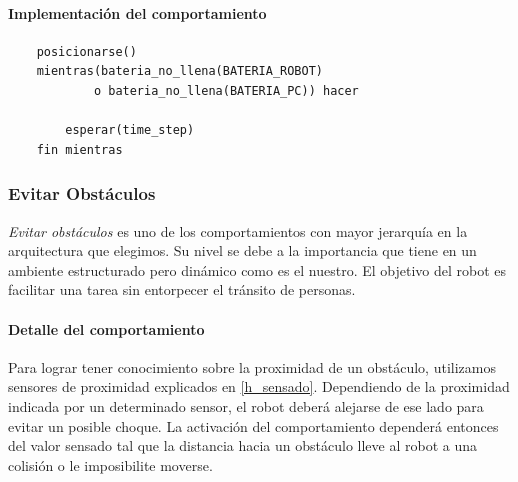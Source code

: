 \paragraph{Implementaci\'on del comportamiento}
\begin{verbatim}
    posicionarse()
    mientras(bateria_no_llena(BATERIA_ROBOT)
            o bateria_no_llena(BATERIA_PC)) hacer

        esperar(time_step)
    fin mientras
\end{verbatim}

\subsubsection{Evitar Obst\'aculos}
\label{avoid_obstacles}
\emph{Evitar obst\'aculos} es uno de los comportamientos con mayor jerarqu\'ia
en la arquitectura que elegimos. Su nivel se debe a la importancia que tiene
en un ambiente estructurado pero din\'amico como es el nuestro. El objetivo
del robot es facilitar una tarea sin entorpecer el tr\'ansito de personas.
\\\indent
\paragraph{Detalle del comportamiento}
Para lograr tener conocimiento sobre la proximidad de un obst\'aculo, utilizamos
sensores de proximidad explicados en \ref{h_sensado}. Dependiendo de la
proximidad indicada por un determinado sensor, el robot deber\'a alejarse
de ese lado para evitar un posible choque. La activaci\'on del comportamiento
depender\'a entonces del valor sensado tal que la distancia
hacia un obst\'aculo lleve al robot a una colisi\'on o le imposibilite
moverse.
